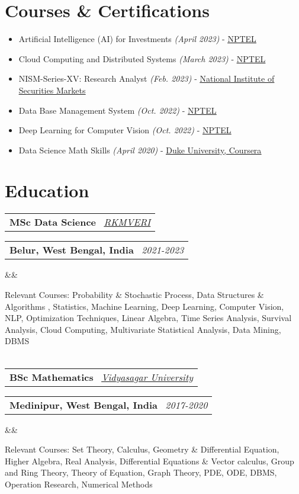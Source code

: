 \documentclass[11pt,a4paper,sans]{moderncv}
\makeatletter
\newcommand*{\customcventry}[7][.13em]{
\begin{tabular}{@{}l}
{\bfseries #4} \
{\itshape #3}
\end{tabular}
\hfill
\begin{tabular}{l@{}}
{\bfseries #5} \
{\itshape #2}
\end{tabular}
\ifx&#7&%
\else{\
\begin{minipage}{\maincolumnwidth}%
\small#7%
\end{minipage}}\fi%
\par\addvspace{#1}}
\makeatother
\begin{document}



\section{Courses \& Certifications}
{\begin{itemize}[label=\textbullet]
    \item Artificial Intelligence (AI) for Investments \textit{(April 2023)} - \underline{\color{blue}\href{https://onlinecourses.nptel.ac.in/noc23_mg63/preview}{NPTEL}}
    \item Cloud Computing and Distributed Systems \textit{(March 2023)} - \underline{\color{blue}\href{https://onlinecourses.nptel.ac.in/noc21_cs15/preview}{NPTEL}}
    \item NISM-Series-XV: Research Analyst \textit{(Feb. 2023)} - \underline{\color{blue}\href{https://www.nism.ac.in/}{National Institute of Securities Markets}}
    \item Data Base Management System \textit{(Oct. 2022)} - \underline{\color{blue}\href{https://onlinecourses.nptel.ac.in/noc21_cs04/preview}{NPTEL}}
    \item Deep Learning for Computer Vision \textit{(Oct. 2022)} - \underline{\color{blue}\href{https://onlinecourses.nptel.ac.in/noc23_cs126/preview}{NPTEL}}
    \item Data Science Math Skills \textit{(April 2020)} - \underline{\color{blue}\href{https://www.coursera.org/learn/datasciencemathskills}{Duke University, Coursera}} 
\end{itemize}}


\section{Education}
\customcventry{2021-2023}{\color{blue}\href{https://rkmvu.ac.in}{RKMVERI}}{MSc Data Science}{Belur, West Bengal, India} {}{}
{{Relevant Courses: Probability \& Stochastic Process, Data Structures \& Algorithms
, Statistics, Machine Learning, Deep Learning, Computer Vision, NLP, Optimization Techniques, Linear Algebra, Time Series Analysis, Survival Analysis, Cloud Computing, Multivariate Statistical Analysis, Data Mining, DBMS} }
\\
\\
\customcventry{2017-2020}{\color{blue}\href{https://rkmvu.ac.in}{Vidyasagar University}}{BSc Mathematics}{Medinipur, West Bengal, India} {}{}
{{Relevant Courses: Set Theory, Calculus, Geometry \& Differential Equation, Higher Algebra, Real Analysis, Differential Equations \& Vector calculus, Group and Ring Theory, Theory of Equation, Graph Theory, PDE, ODE, DBMS, Operation Research, Numerical Methods}}
\end{document}
